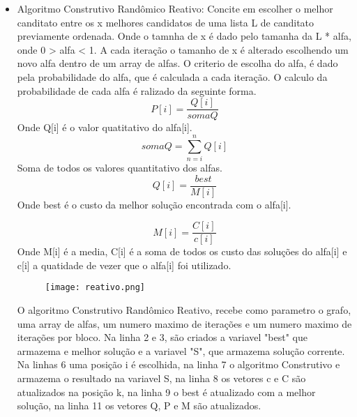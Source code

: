 \documentclass[12pt, fleqn]{article}
\begin{document}
\begin{itemize}
		  
	    \item Algoritmo Construtivo Randômico Reativo:
		  \quad Concite em escolher o melhor canditato entre os x melhores candidatos de uma lista L de canditato previamente ordenada.
		       Onde o tamnha de x é dado pelo tamanha da L * alfa, onde 0 > alfa < 1. 
		       A cada iteração o tamanho de x é alterado escolhendo um novo alfa dentro de um array de alfas.
		       O criterio de escolha do alfa, é dado pela probabilidade do alfa, que é calculada a cada iteração.
		  \quad O calculo da probabilidade de cada alfa é ralizado da seguinte forma.
		    \begin{equation}
			P[i] = \frac{Q[i]} {somaQ}			
		    \end{equation}
		    Onde Q[i] é o valor quatitativo do alfa[i].
		    \begin{equation}
		     somaQ = {\sum_{n=i}^{n} Q[i]} 
		    \end{equation}
		    Soma de todos os valores quantitativo dos alfas.		    
		    \begin{equation}
		      Q[i] = \frac{best}{M[i]}
		    \end{equation}
		    Onde best é o custo da melhor solução encontrada com o alfa[i].		    
		  
		    \newpage
		    
		    \begin{equation}
		      M[i] = \frac {C[i]} {c[i]}
		    \end{equation}    
		    Onde M[i] é a media, C[i] é a soma de todos os custo das soluções do alfa[i] e c[i] a quatidade de vezer que o alfa[i] foi utilizado.		    
		    \\
			   
	      \begin{figure}[!htpb]
		\texttt{[image: reativo.png]}
		\label{fig:reativo}
	      \end{figure}
	      
 	      \quad O algoritmo Construtivo Randômico Reativo, recebe como parametro o grafo, uma array de alfas, um numero maximo de iterações e um numero maximo de iterações por bloco.
		   Na linha 2 e 3, são criados  a variavel "best" que armazema e melhor solução  e a variavel "S", que armazema solução corrente.
		   Na linhas 6 uma posição i é escolhida, na linha 7 o algoritmo Construtivo e armazema o resultado na variavel S, na linha 8 os vetores c e C são atualizados na posição k,
		   na linha 9 o best é atualizado com a melhor solução, na linha 11 os vetores Q, P e M são atualizados.
	      
	  \end{itemize}	  
	  
\end{document}
